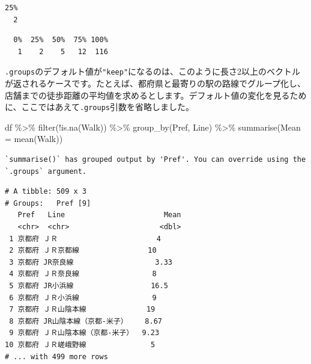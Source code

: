 \documentclass[
  a4paper,
  pandoc,
  ja=standard,
  jafont=haranoaji]{bxjsbook}
\newenvironment{Shaded}{\begin{snugshade}}{\end{snugshade}}
\newcommand{\AttributeTok}[1]{\textcolor[rgb]{0.00,0.48,0.65}{#1}}
\newcommand{\CommentTok}[1]{\textcolor[rgb]{0.37,0.37,0.37}{#1}}
\newcommand{\ConstantTok}[1]{\textcolor[rgb]{0.56,0.35,0.01}{#1}}
\newcommand{\FloatTok}[1]{\textcolor[rgb]{0.68,0.00,0.00}{#1}}
\newcommand{\FunctionTok}[1]{\textcolor[rgb]{0.28,0.35,0.67}{#1}}
\newcommand{\NormalTok}[1]{\textcolor[rgb]{0.00,0.48,0.65}{#1}}
\newcommand{\SpecialCharTok}[1]{\textcolor[rgb]{0.37,0.37,0.37}{#1}}
\begin{document}
\begin{Shaded}
\end{Shaded}

\begin{verbatim}
25% 
  2 
\end{verbatim}

\begin{Shaded}
\end{Shaded}

\begin{verbatim}
  0%  25%  50%  75% 100% 
   1    2    5   12  116 
\end{verbatim}

\texttt{.groups}のデフォルト値が\texttt{"keep"}になるのは、このように長さ2以上のベクトルが返されるケースです。たとえば、都府県と最寄りの駅の路線でグループ化し、店舗までの徒歩距離の平均値を求めるとします。デフォルト値の変化を見るために、ここではあえて\texttt{.groups}引数を省略しました。

\begin{Shaded}
\begin{Highlighting}[numbers=left,,]
\NormalTok{df }\SpecialCharTok{\%\textgreater{}\%}
  \FunctionTok{filter}\NormalTok{(}\SpecialCharTok{!}\FunctionTok{is.na}\NormalTok{(Walk)) }\SpecialCharTok{\%\textgreater{}\%}
  \FunctionTok{group\_by}\NormalTok{(Pref, Line) }\SpecialCharTok{\%\textgreater{}\%}
  \FunctionTok{summarise}\NormalTok{(}\AttributeTok{Mean =} \FunctionTok{mean}\NormalTok{(Walk))}
\end{Highlighting}
\end{Shaded}

\begin{verbatim}
`summarise()` has grouped output by 'Pref'. You can override using the
`.groups` argument.
\end{verbatim}

\begin{verbatim}
# A tibble: 509 x 3
# Groups:   Pref [9]
   Pref   Line                       Mean
   <chr>  <chr>                     <dbl>
 1 京都府 ＪＲ                       4   
 2 京都府 ＪＲ京都線                10   
 3 京都府 JR奈良線                   3.33
 4 京都府 ＪＲ奈良線                 8   
 5 京都府 JR小浜線                  16.5 
 6 京都府 ＪＲ小浜線                 9   
 7 京都府 ＪＲ山陰本線              19   
 8 京都府 JR山陰本線（京都-米子）    8.67
 9 京都府 ＪＲ山陰本線（京都-米子）  9.23
10 京都府 ＪＲ嵯峨野線               5   
# ... with 499 more rows
\end{verbatim}
\end{document}
